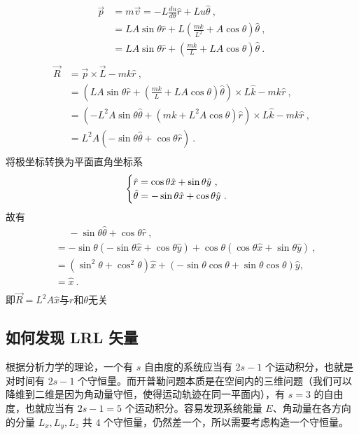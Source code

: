 \begin{align}
\vec p &= m \vec v = -L\frac{du}{d\theta}\hat r + Lu \hat \theta ~,\\
&=L A \sin \theta \hat r + L \left(\frac{mk}{L^{2}} + A \cos \theta \right)\hat \theta ~,\\
&=L A \sin \theta \hat r + \left(\frac{mk}{L} +L A \cos \theta \right)\hat \theta ~.\\
\end{align}
\begin{align}
\vec R &= \vec p \times \vec L - mk \hat r ~,\\
&=\left(L A \sin \theta \hat r + \left(\frac{mk}{L} +L A \cos \theta \right)\hat \theta \right) \times L \hat k -mk\hat r ~,\\
&=\left(-L^{2} A \sin \theta \hat \theta + \left(mk +L^{2} A \cos \theta \right)\hat r \right) \times L \hat k -mk\hat r ~,\\
&= L^{2}A\left(-\sin \theta \hat \theta+\cos \theta \hat r \right) ~.\\
\end{align}
将极坐标转换为平面直角坐标系
\begin{equation}
\begin{cases}
$$\hat r = \cos \theta \hat{x} + \sin \theta \hat{y} ~,\\
$$\hat \theta = -\sin \theta \hat{x} +\cos \theta \hat{y} ~.\\
\end{cases}
\end{equation}
故有
\begin{align}
&\phantom{=} -\sin \theta \hat \theta+\cos \theta \hat r ~,\\
&=-\sin \theta \left(-\sin \theta \hat{x} +\cos \theta \hat{y}\right)+ \cos \theta \left(\cos \theta \hat{x} + \sin \theta \hat{y} \right)~,\\
&= \left(\sin^{2}\theta + \cos^{2}\theta\right)\hat x + \left(-\sin \theta \cos \theta +\sin \theta \cos \theta \right)\hat y ,\\
&= \hat x ~.\\
\end{align}
即$\vec R = L^{2}A \hat x$与$r$和$\theta$无关


\subsection{如何发现 LRL 矢量}
根据分析力学的理论，一个有 $s$ 自由度的系统应当有 $2s-1$ 个运动积分，也就是对时间有 $2s-1$ 个守恒量。而开普勒问题本质是在空间内的三维问题（我们可以降维到二维是因为角动量守恒，使得运动轨迹在同一平面内），有 $s=3$ 的自由度，也就应当有 $2s-1=5$ 个运动积分。容易发现系统能量 $E$、角动量在各方向的分量 $L_x, L_y, L_z$ 共 $4$ 个守恒量，仍然差一个，所以需要考虑构造一个守恒量。

